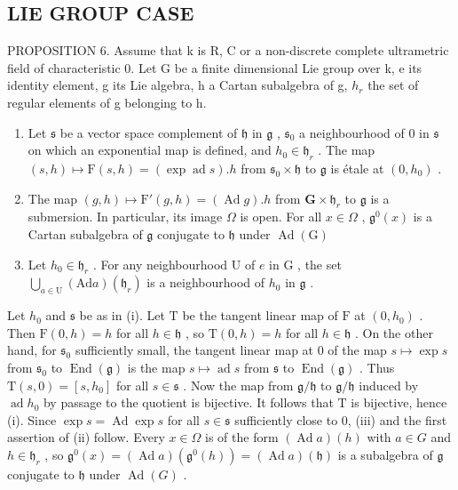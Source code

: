 \subsection{LIE GROUP CASE}

PROPOSITION 6. Assume that k is R, C or a non-discrete complete ultrametric field of characteristic 0. Let G be a finite dimensional Lie group over k, e its identity element, g its Lie algebra, h a Cartan subalgebra of g, \(h_{r}\) the set of regular elements of g belonging to h.

\begin{enumerate}
\def\labelenumi{(\roman{enumi})}
\item
  Let \(\mathfrak{s}\) be a vector space complement of \(\mathfrak{h}\) in \(\mathfrak{g}\) , \(\mathfrak{s}_0\) a neighbourhood of 0 in \(\mathfrak{s}\) on which an exponential map is defined, and \(h_0 \in \mathfrak{h}_r\) . The map \((s, h) \mapsto \mathrm{F}(s, h) = (\exp \operatorname{ad} s).h\) from \(\mathfrak{s}_0 \times \mathfrak{h}\) to \(\mathfrak{g}\) is étale at \((0, h_0)\) .
\item
  The map \((g,h)\mapsto \mathrm{F}'(g,h) = (\operatorname {Ad}g).h\) from \(\mathbf{G}\times \mathfrak{h}_r\) to \(\mathfrak{g}\) is a submersion. In particular, its image \(\Omega\) is open. For all \(x\in \Omega\) , \(\mathfrak{g}^0 (x)\) is a Cartan subalgebra of \(\mathfrak{g}\) conjugate to \(\mathfrak{h}\) under \(\operatorname {Ad}(\mathrm{G})\)
\item
  Let \(h_0 \in \mathfrak{h}_r\) . For any neighbourhood \(\mathrm{U}\) of \(e\) in \(\mathrm{G}\) , the set \(\bigcup_{a \in \mathrm{U}} (\mathrm{Ad}a)(\mathfrak{h}_r)\) is a neighbourhood of \(h_0\) in \(\mathfrak{g}\) .
\end{enumerate}

Let \(h_0\) and \(\mathfrak{s}\) be as in (i). Let \(\mathrm{T}\) be the tangent linear map of \(\mathrm{F}\) at \((0, h_0)\) . Then \(\mathrm{F}(0, h) = h\) for all \(h \in \mathfrak{h}\) , so \(\mathrm{T}(0, h) = h\) for all \(h \in \mathfrak{h}\) . On the other hand, for \(\mathfrak{s}_0\) sufficiently small, the tangent linear map at 0 of the map \(s \mapsto \exp s\) from \(\mathfrak{s}_0\) to \(\operatorname{End}(\mathfrak{g})\) is the map \(s \mapsto \operatorname{ad}s\) from \(\mathfrak{s}\) to \(\operatorname{End}(\mathfrak{g})\) . Thus \(\mathrm{T}(s, 0) = [s, h_0]\) for all \(s \in \mathfrak{s}\) . Now the map from \(\mathfrak{g}/\mathfrak{h}\) to \(\mathfrak{g}/\mathfrak{h}\) induced by \(\operatorname{ad}h_0\) by passage to the quotient is bijective. It follows that \(\mathrm{T}\) is bijective, hence (i). Since \(\exp s = \operatorname{Ad}\exp s\) for all \(s \in \mathfrak{s}\) sufficiently close to 0, (iii) and the first assertion of (ii) follow. Every \(x \in \Omega\) is of the form \((\operatorname{Ad}a)(h)\) with \(a \in G\) and \(h \in \mathfrak{h}_r\) , so \(\mathfrak{g}^0(x) = (\operatorname{Ad}a)(\mathfrak{g}^0(h)) = (\operatorname{Ad}a)(\mathfrak{h})\) is a subalgebra of \(\mathfrak{g}\) conjugate to \(\mathfrak{h}\) under \(\operatorname{Ad}(G)\) .

